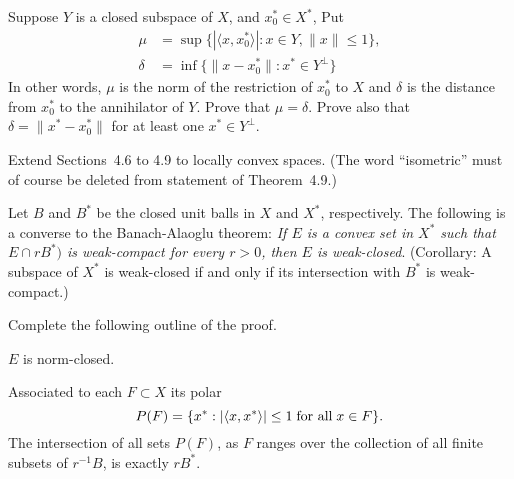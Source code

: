 \begin{enumerate}
\begin{itemize}


\end{itemize}


\unfinished

\begin{excopy}
Suppose $Y$ is a closed subspace of $X$, and \(x_0^* \in X^*\), Put
\begin{align*}
\mu &= \sup\{|\langle x, x_0^*\rangle|: x\in Y, \|x\| \leq 1\}, \\
\delta &= \inf\{\| x -  x_0^*\|: x^*\in Y^\perp\}
\end{align*}
In other words, \(\mu\) is the norm of the restriction of \(x_0^*\) to $X$
 and \(\delta\) is the distance from
\(x_0^*\) to the annihilator of $Y$. Prove that \(\mu = \delta\).
 Prove also that \(\delta = \|x^* - x_0^*\|\) for at
least one \(x^* \in Y^\perp \).
\end{excopy}


\unfinished

\begin{excopy}
Extend Sections~4.6 to 4.9 to locally convex spaces.
 (The word ``isometric'' must of
course be deleted from statement of Theorem~4.9.)
\end{excopy}


\unfinished

\begin{excopy}
Let $B$ and \(B^*\) be the closed unit balls in $X$ and \(X^*\), respectively.
 The following is a
converse to the Banach-Alaoglu theorem:
\textsl{If $E$ is a convex set in \(X^*\) such that \(E \cap rB^*)\)
is weak\upstar-compact
 for every \(r > 0\),
 then $E$ is
 weak\upstar-closed}.
 (Corollary: A subspace of \(X^*\)
is weak\upstar-closed if and only if its intersection with \(B^*\)
 is weak\upstar-compact.)

Complete the following outline of the proof.

\begin{itemize}

$E$ is norm-closed.

Associated to each \(F \subset X\) its polar
\begin{equation*}
P(F) = \{x^*: |\langle x, x^* \rangle| \leq 1 \;\textnormal{for all}\; x\in F\}.
\end{equation*}
The intersection of all sets \(P(F)\), as $F$ ranges over the collection of all
 finite subsets
of \(r^{-1}B\), is exactly \(rB^*\).


\end{itemize}
\end{excopy}
\end{enumerate}
